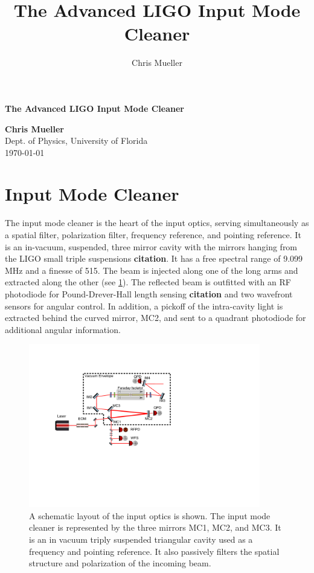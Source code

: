 \documentclass[10pt,a4paper]{article}
\title{The Advanced LIGO Input Mode Cleaner}
\author{Chris Mueller}
\begin{document}
\begin{large}
\begin{center}
\begin{LARGE}
\textbf{The Advanced LIGO Input Mode Cleaner}\\
\end{LARGE}
\vspace{0.50in}
\textbf{Chris Mueller} \\
Dept. of Physics, University of Florida\\
\today
\end{center}
\end{large}
\vspace{1pc}
\tableofcontents
\pagebreak[4]

\section{Input Mode Cleaner}

The input mode cleaner is the heart of the input optics, serving simultaneously as a spatial filter, 
polarization filter, frequency reference, and pointing reference.  
It is an in-vacuum, suspended, three mirror cavity with the mirrors hanging from the LIGO small triple 
suspensions \textbf{citation}.  
It has a free spectral range of 9.099 MHz and a finesse of 515.  
The beam is injected along one of the long arms and extracted along the other (see \ref{fig:ioAll}).  
The reflected beam is outfitted with an RF photodiode for Pound-Drever-Hall length sensing \textbf{citation} 
and two wavefront sensors for angular control.  
In addition, a pickoff of the intra-cavity light is extracted behind the curved mirror, MC2, and sent to a 
quadrant photodiode for additional angular information.  

\begin{figure}
	\centering
	\includegraphics[width=0.9\textwidth, trim=3.5cm 7.5cm 11cm 3.5cm]{IO_Drawing.pdf}
	\caption{A schematic layout of the input optics is shown.  
		The input mode cleaner is represented by the three mirrors MC1, MC2, and MC3.  
		It is an in vacuum triply suspended triangular cavity used as a frequency 
		and pointing reference.  It also passively filters the spatial structure 
		and polarization of the incoming beam.}
	\label{fig:ioAll}
\end{figure}		
\end{document}
